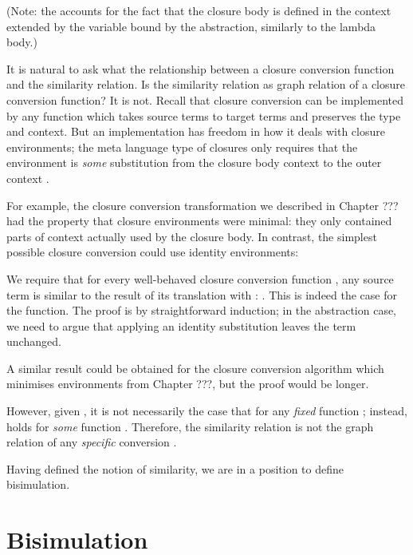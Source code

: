 \documentclass[bsc,frontabs,twoside,singlespacing,parskip,deptreport]{infthesis}
\theoremstyle{definition}
\begin{document}
(Note: the  accounts for the fact that the closure body is
defined in the context  extended by the variable bound by the
abstraction, similarly to the lambda body.)

It is natural to ask what the relationship between a closure
conversion function and the similarity relation. Is the similarity
relation as graph relation of a closure conversion function? It is
not. Recall that closure conversion can be implemented by any function
which takes source terms to target terms and preserves the type and
context. But an implementation has freedom in how it deals with
closure environments; the meta language type of closures only requires
that the environment is \textit{some} substitution from the closure
body context  to the outer context .

For example, the closure conversion transformation we described in
Chapter ??? had the property that closure environments were minimal:
they only contained parts of context actually used by the closure
body. In contrast, the simplest possible closure conversion could use
identity environments:


We require that for every well-behaved closure conversion function , any
source term  is similar to the result of its translation with
: . This is indeed the case for the 
function. The proof is by straightforward induction; in the
abstraction case, we need to argue that applying an identity substitution
leaves the term unchanged.


A similar result could be obtained for the closure conversion
algorithm which minimises environments from Chapter ???, but the proof
would be longer.

However, given , it is not
necessarily the case that  for any \textit{fixed}
function ; instead,  holds for \textit{some}
function . Therefore, the similarity relation is not the graph
relation of any \textit{specific} conversion .

Having defined the notion of similarity, we are in a position to
define bisimulation.

\section{Bisimulation}
\end{document}

